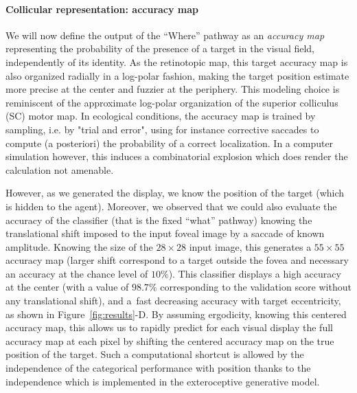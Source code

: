 \paragraph{Collicular representation: accuracy map}
We will now define the output of the ``Where'' pathway as an \emph{accuracy map} representing the probability of the presence of a target in the visual field, independently of its identity. As the retinotopic map, this target accuracy map is also organized radially in a log-polar fashion, making the target position estimate more precise at the center and fuzzier at the periphery. This modeling choice is reminiscent of the approximate log-polar organization of the superior colliculus (SC) motor map. In ecological conditions, the accuracy map is trained by sampling, i.e. by "trial and error", using for instance corrective saccades to compute (a posteriori) the probability of a correct localization. In a computer simulation however, this induces a combinatorial explosion which does render the calculation not amenable.

However, as we generated the display, we know the position of the target (which is hidden to the agent). Moreover, we observed that we could also evaluate the accuracy of the classifier (that is the fixed ``what'' pathway) knowing the translational shift imposed to the input foveal image by a saccade of known amplitude. Knowing the size of the $28\times 28$ input image, this generates a $55\times 55$ accuracy map (larger shift correspond to a target outside the fovea and necessary an accuracy at the chance level of $10\%$). This classifier displays a high accuracy at the center (with a value of $98.7\%$ corresponding to the validation score without any translational shift), and a fast decreasing accuracy with target eccentricity, as shown in Figure~\ref{fig:results}-D. By assuming ergodicity, knowing this centered accuracy map, this allows us to rapidly predict for each visual display the full accuracy map at each pixel by shifting the centered accuracy map on the true position of the target. Such a computational shortcut is allowed by the independence of the categorical performance with position thanks to the independence which is implemented in the exteroceptive generative model.

